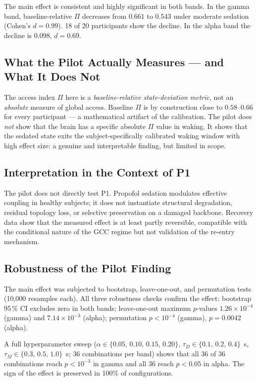 \documentclass[11pt,a4paper]{article}
\theoremstyle{plain}
\theoremstyle{definition}
\theoremstyle{remark}
\begin{document}
The main effect is consistent and highly significant in both bands. In the gamma band, baseline-relative $\Pi$ decreases from $0.661$ to $0.543$ under moderate sedation (Cohen's $d = 0.99$). 18 of 20 participants show the decline. In the alpha band the decline is $0.098$, $d = 0.69$.

\subsection{What the Pilot Actually Measures --- and What It Does Not}
\label{sec:pilot-framing}

The access index $\Pi$ here is a \emph{baseline-relative state-deviation metric}, not an \emph{absolute} measure of global access. Baseline $\Pi$ is by construction close to $0.58$--$0.66$ for every participant --- a mathematical artifact of the calibration. The pilot does \emph{not} show that the brain has a specific absolute $\Pi$ value in waking. It shows that the sedated state exits the subject-specifically calibrated waking window with high effect size: a genuine and interpretable finding, but limited in scope.

\subsection{Interpretation in the Context of P1}

The pilot does not directly test P1. Propofol sedation modulates effective coupling in healthy subjects; it does not instantiate structural degradation, residual topology loss, or selective preservation on a damaged backbone. Recovery data show that the measured effect is at least partly reversible, compatible with the conditional nature of the GCC regime but not validation of the re-entry mechanism.

\subsection{Robustness of the Pilot Finding}

The main effect was subjected to bootstrap, leave-one-out, and permutation tests (10{,}000 resamples each). All three robustness checks confirm the effect: bootstrap 95\,\% CI excludes zero in both bands; leave-one-out maximum $p$-values $1.26 \times 10^{-4}$ (gamma) and $7.14 \times 10^{-3}$ (alpha); permutation $p < 10^{-4}$ (gamma), $p = 0.0042$ (alpha).

A full hyperparameter sweep ($\alpha \in \{0.05,\,0.10,\,0.15,\,0.20\}$, $\tau_D \in \{0.1,\,0.2,\,0.4\}$~s, $\tau_M \in \{0.3,\,0.5,\,1.0\}$~s; 36 combinations per band) shows that all 36 of 36 combinations reach $p < 10^{-3}$ in gamma and all 36 reach $p < 0.05$ in alpha. The sign of the effect is preserved in 100\% of configurations.
\end{document}
